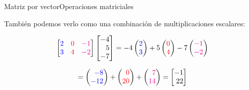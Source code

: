 \documentclass[spanish, c]{beamer}
\begin{document}
\begin{frame}{Matriz por vector}{Operaciones matriciales}
    
    También podemos verlo como una combinación de multiplicaciones escalares:

    \bigskip

    \[%
        \begin{bmatrix*}[r]
            {\color{blue} 2} & {\color{red} 0} & {\color{magenta} -1}\\
            {\color{blue} 3} & {\color{red} 4} & {\color{magenta} -2}
        \end{bmatrix*}
        \begin{bmatrix*}[r]
            -4 \\
            5 \\
            -7
        \end{bmatrix*} =
        -4 %
        \begin{pmatrix*}[r]
            \color{blue} 2 \\ \color{blue} 3
        \end{pmatrix*}
        + 5 %
        \begin{pmatrix*}[r]
            \color{red} 0 \\ \color{red} 4
        \end{pmatrix*}
        -7 %
        \begin{pmatrix*}[r]
            \color{magenta} -1 \\ \color{magenta} -2
        \end{pmatrix*}
    \]

    \bigskip

    \[= %
        \begin{pmatrix*}[r]
            \color{blue} -8 \\ \color{blue} -12
        \end{pmatrix*}
        + %
        \begin{pmatrix*}[r]
            \color{red} 0 \\ \color{red} 20
        \end{pmatrix*}
        + %
        \begin{pmatrix*}[r]
            \color{magenta} 7 \\ \color{magenta} 14
        \end{pmatrix*}
        = %
        \begin{bmatrix*}[r]
            -1 \\ 22
        \end{bmatrix*}
    \]

\end{frame}
\end{document}
